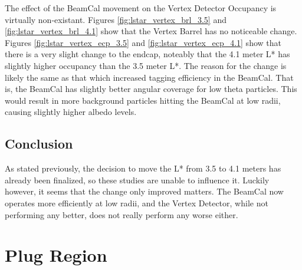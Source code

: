\documentclass{report}
\begin{document}
                The effect of the BeamCal movement on the Vertex Detector Occupancy is virtually non-existant. Figures \ref{fig:lstar_vertex_brl_3.5} and \ref{fig:lstar_vertex_brl_4.1} show that the Vertex Barrel has no noticeable change. Figures \ref{fig:lstar_vertex_ecp_3.5} and \ref{fig:lstar_vertex_ecp_4.1} show that there is a very slight change to the endcap, noteably that the 4.1 meter L* has slightly higher occupancy than the 3.5 meter L*. The reason for the change is likely the same as that which increased tagging efficiency in the BeamCal. That is, the BeamCal has slightly better angular coverage for low theta particles. This would result in more background particles hitting the BeamCal at low radii, causing slightly higher albedo levels.

            \subsection{Conclusion}
                As stated previously, the decision to move the L* from 3.5 to 4.1 meters has already been finalized, so these studies are unable to influence it. Luckily however, it seems that the change only improved matters. The BeamCal now operates more efficiently at low radii, and the Vertex Detector, while not performing any better, does not really perform any worse either.


        \section{Plug Region}
\end{document}
